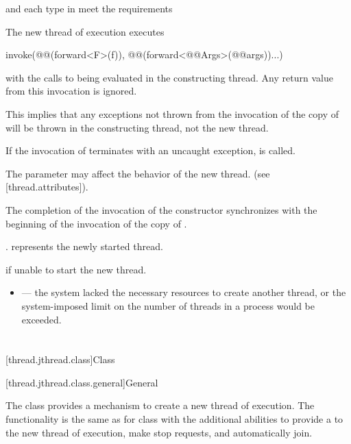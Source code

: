 \documentclass{wg21}
\begin{document}
\begin{itemdescr}
\pnum
\expects
{} and each type in  meet the
 requirements

\pnum
\effects
The new thread of execution executes
\begin{codeblock}
    invoke(@@(forward<F>(f)), @@(forward<@@Args>(@@args))...)
\end{codeblock}
with the calls to
 being evaluated in the constructing thread.
Any return value from this invocation is ignored.
\begin{note}
    This implies that any exceptions not thrown from the invocation of the copy
    of  will be thrown in the constructing thread, not the new thread.
\end{note}
If the invocation of  terminates with an uncaught exception,
 is called.

\begin{addedblock}
The parameter  may affect the behavior of the new thread. (see [thread.attributes]).
\end{addedblock}

\pnum
\sync
The completion of the invocation of the constructor
synchronizes with the beginning of the invocation of the copy of .

\pnum
\ensures
{}.  represents the newly started thread.

\pnum
\throws
{} if unable to start the new thread.

\pnum
\errors
\begin{itemize}
    \item {} --- the system lacked the necessary
    resources to create another thread, or the system-imposed limit on the number of
    threads in a process would be exceeded.
\end{itemize}
\end{itemdescr}

\section{}

[thread.jthread.class]{Class }

[thread.jthread.class.general]{General}

\pnum
The class  provides a mechanism
to create a new thread of execution.
The functionality is the same as for
class 
with the additional abilities to provide
a  to the new thread of execution,
make stop requests, and automatically join.
\end{document}
